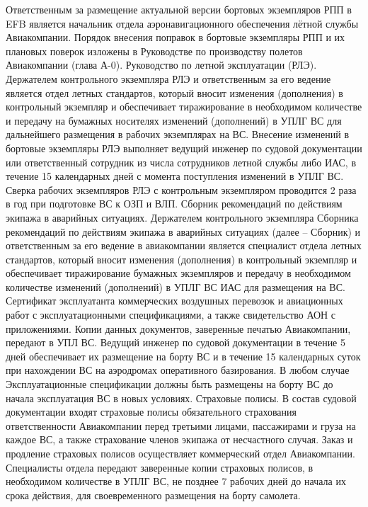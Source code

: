 Ответственным за размещение актуальной версии бортовых экземпляров РПП в EFB является начальник отдела аэронавигационного обеспечения лётной службы Авиакомпании.
Порядок внесения поправок в бортовые экземпляры РПП и их плановых поверок изложены в Руководстве по производству полетов Авиакомпании (глава А-0).
Руководство по летной эксплуатации (РЛЭ).
Держателем контрольного экземпляра РЛЭ и ответственным за его ведение является отдел летных стандартов, который вносит изменения (дополнения) в контрольный экземпляр и обеспечивает тиражирование в необходимом количестве и передачу на бумажных носителях изменений (дополнений) в УПЛГ ВС для дальнейшего размещения в рабочих экземплярах на ВС.
Внесение изменений в бортовые экземпляры РЛЭ выполняет ведущий инженер по судовой документации или ответственный сотрудник из числа сотрудников летной службы либо ИАС, в течение 15 календарных дней с момента поступления изменений в УПЛГ ВС. 
Сверка рабочих экземпляров РЛЭ с контрольным экземпляром проводится 2 раза в год при подготовке ВС к ОЗП и ВЛП. 
Сборник рекомендаций по действиям экипажа в аварийных ситуациях. 
Держателем контрольного экземпляра Сборника рекомендаций по действиям экипажа в аварийных ситуациях (далее – Сборник) и ответственным за его ведение в авиакомпании является специалист отдела летных стандартов, который вносит изменения (дополнения) в контрольный экземпляр и обеспечивает тиражирование бумажных экземпляров и передачу в необходимом количестве изменений (дополнений) в УПЛГ ВС ИАС для размещения на ВС.  
Сертификат эксплуатанта коммерческих воздушных перевозок и авиационных работ с эксплуатационными спецификациями, а также свидетельство АОН с приложениями.
Копии данных документов, заверенные печатью Авиакомпании, передают в УПЛ ВС. Ведущий инженер по судовой документации в течение 5 дней обеспечивает их размещение на борту ВС и в течение 15 календарных суток при нахождении ВС на аэродромах оперативного базирования. В любом случае Эксплуатационные спецификации должны быть размещены на борту ВС до начала эксплуатация ВС в новых условиях.
 Страховые полисы.
В состав судовой документации входят страховые полисы обязательного страхования ответственности Авиакомпании перед третьими лицами, пассажирами и груза на каждое ВС, а также страхование членов экипажа от несчастного случая. Заказ и продление страховых полисов осуществляет коммерческий отдел Авиакомпании. Специалисты отдела передают заверенные копии страховых полисов, в необходимом количестве в УПЛГ ВС, не позднее 7 рабочих дней до начала их срока действия, для своевременного размещения на борту самолета. 
